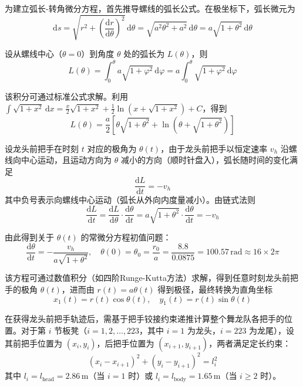 \documentclass{mcmthesis}
\begin{document}
为建立弧长-转角微分方程，首先推导螺线的弧长公式。在极坐标下，弧长微元为
\begin{equation}
\mathrm{d}s = \sqrt{r^2 + \left(\frac{\mathrm{d}r}{\mathrm{d}\theta}\right)^2}\,\mathrm{d}\theta = \sqrt{a^2\theta^2 + a^2}\,\mathrm{d}\theta = a\sqrt{1+\theta^2}\,\mathrm{d}\theta
\end{equation}

设从螺线中心（$\theta=0$）到角度 $\theta$ 处的弧长为 $L(\theta)$，则
\begin{equation}
L(\theta) = \int_0^{\theta} a\sqrt{1+\varphi^2}\,\mathrm{d}\varphi = a\int_0^{\theta}\sqrt{1+\varphi^2}\,\mathrm{d}\varphi
\end{equation}

该积分可通过标准公式求解。利用 $\int\sqrt{1+x^2}\,\mathrm{d}x = \frac{x}{2}\sqrt{1+x^2} + \frac{1}{2}\ln(x+\sqrt{1+x^2}) + C$，得到
\begin{equation}
L(\theta) = \frac{a}{2}\left[\theta\sqrt{1+\theta^2} + \ln\left(\theta+\sqrt{1+\theta^2}\right)\right]
\end{equation}

设龙头前把手在时刻 $t$ 对应的极角为 $\theta(t)$，由于龙头前把手以恒定速率 $v_h$ 沿螺线向中心运动，且运动方向为 $\theta$ 减小的方向（顺时针盘入），弧长随时间的变化满足
\begin{equation}
\frac{\mathrm{d}L}{\mathrm{d}t} = -v_h
\end{equation}
其中负号表示向螺线中心运动（弧长从外向内度量减小）。由链式法则
\begin{equation}
\frac{\mathrm{d}L}{\mathrm{d}t} = \frac{\mathrm{d}L}{\mathrm{d}\theta}\cdot\frac{\mathrm{d}\theta}{\mathrm{d}t} = a\sqrt{1+\theta^2}\cdot\frac{\mathrm{d}\theta}{\mathrm{d}t} = -v_h
\end{equation}

由此得到关于 $\theta(t)$ 的常微分方程初值问题：
\begin{equation}
\frac{\mathrm{d}\theta}{\mathrm{d}t} = -\frac{v_h}{a\sqrt{1+\theta^2}}, \quad \theta(0) = \theta_0 = \frac{r_0}{a} = \frac{8.8}{0.0875} = 100.57\,\text{rad} \approx 16\times 2\pi
\end{equation}

该方程可通过数值积分（如四阶Runge-Kutta方法）求解，得到任意时刻龙头前把手的极角 $\theta(t)$，进而由 $r(t)=a\theta(t)$ 得到极径，最终转换为直角坐标
\begin{equation}
x_1(t) = r(t)\cos\theta(t), \quad y_1(t) = r(t)\sin\theta(t)
\end{equation}

在获得龙头前把手轨迹后，需基于把手铰接约束递推计算整个舞龙队各把手的位置。对于第 $i$ 节板凳（$i=1,2,\ldots,223$，其中 $i=1$ 为龙头，$i=223$ 为龙尾），设其前把手位置为 $(x_i, y_i)$，后把手位置为 $(x_{i+1}, y_{i+1})$，两者满足定长约束：
\begin{equation}
(x_i - x_{i+1})^2 + (y_i - y_{i+1})^2 = l_i^2
\end{equation}
其中 $l_i = l_{\text{head}} = 2.86\,\text{m}$（当 $i=1$ 时）或 $l_i = l_{\text{body}} = 1.65\,\text{m}$（当 $i \geq 2$ 时）。
\end{document}
